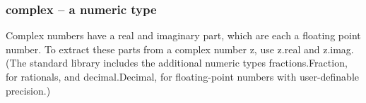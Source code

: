 \subsubsection{complex -- a numeric type}
Complex numbers have a real and imaginary part, which are each a floating point number.
To extract these parts from a complex number z, use z.real and z.imag.
(The standard library includes the additional numeric types fractions.Fraction, for rationals, and decimal.Decimal, for floating-point numbers with user-definable precision.)